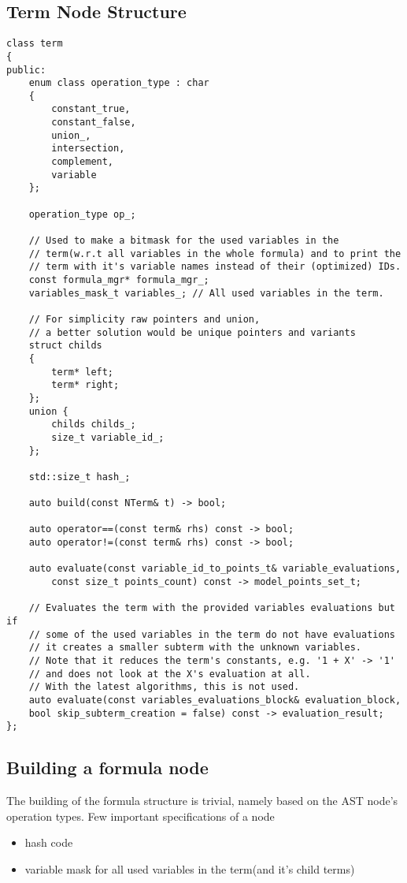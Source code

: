 \documentclass{article}
\begin{document}
		\subsection*{Term Node Structure}
		\begin{lstlisting}
class term
{
public:
    enum class operation_type : char
    {
        constant_true,
        constant_false,
        union_,
        intersection,
        complement,
        variable
    };

    operation_type op_;

    // Used to make a bitmask for the used variables in the 
    // term(w.r.t all variables in the whole formula) and to print the
    // term with it's variable names instead of their (optimized) IDs.
    const formula_mgr* formula_mgr_; 
    variables_mask_t variables_; // All used variables in the term.

    // For simplicity raw pointers and union, 
    // a better solution would be unique pointers and variants
    struct childs
    {
        term* left;
        term* right;
    };
    union {
        childs childs_;
        size_t variable_id_;
    };

    std::size_t hash_;

    auto build(const NTerm& t) -> bool;

    auto operator==(const term& rhs) const -> bool;
    auto operator!=(const term& rhs) const -> bool;

    auto evaluate(const variable_id_to_points_t& variable_evaluations, 
    	const size_t points_count) const -> model_points_set_t;

    // Evaluates the term with the provided variables evaluations but if
    // some of the used variables in the term do not have evaluations
    // it creates a smaller subterm with the unknown variables.
    // Note that it reduces the term's constants, e.g. '1 + X' -> '1'
    // and does not look at the X's evaluation at all.
    // With the latest algorithms, this is not used.
    auto evaluate(const variables_evaluations_block& evaluation_block, 
	bool skip_subterm_creation = false) const -> evaluation_result;
};
		\end{lstlisting}
	

	\subsection{Building a formula node}  %
		The building of the formula structure is trivial, namely based on the AST node's operation types.
		Few important specifications of a node 
		\begin{itemize}
			\item hash code
			\item variable mask for all used variables in the term(and it's child terms)
		\end{itemize}
\end{document}
